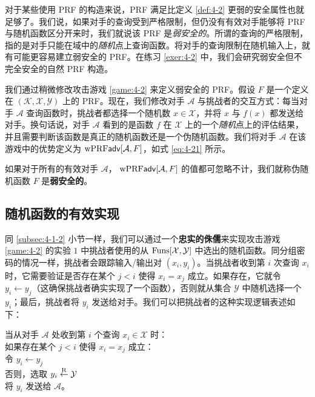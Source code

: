\begin{snote}[弱安全的伪随机函数。]
对于某些使用 PRF 的构造来说，PRF 满足比定义 \ref{def:4-2} 更弱的安全属性也就足够了。我们说，如果对手的查询受到严格限制，但仍没有有效对手能够将 PRF 与随机函数区分开来时，我们就说该 PRF 是\emph{弱安全的}。所谓的查询的严格限制，指的是对手只能在域中的\emph{随机}点上查询函数。将对手的查询限制在随机输入上，就有可能更容易建立弱安全的 PRF。在练习 \ref{exer:4-2} 中，我们会研究弱安全但不完全安全的自然 PRF 构造。

我们通过稍微修改攻击游戏 \ref{game:4-2} 来定义弱安全的 PRF。假设 $F$ 是一个定义在 $(\mathcal{K},\mathcal{X},\mathcal{Y})$ 上的 PRF。现在，我们修改对手 $\mathcal{A}$ 与挑战者的交互方式：每当对手 $\mathcal{A}$ 查询函数时，挑战者都选择一个随机数 $x\in\mathcal{X}$，并将 $x$ 与 $f(x)$ 都发送给对手。换句话说，对手 $\mathcal{A}$ 看到的是函数 $f$ 在 $\mathcal{X}$ 上的一个\emph{随机}点上的评估结果，并且需要判断该函数是真正的随机函数还是一个伪随机函数。我们将对手 $\mathcal{A}$ 在该游戏中的优势定义为 ${\rm wPRF\mathsf{adv}}[\mathcal{A}, F]$，如式 \ref{eq:4-21} 所示。
\end{snote}

\begin{definition}\label{def:4-3}
如果对于所有的有效对手 $\mathcal{A}$， ${\rm wPRF\mathsf{adv}}[\mathcal{A}, F]$ 的值都可忽略不计，我们就称伪随机函数 $F$ 是\textbf{弱安全的}。
\end{definition}

\subsection{随机函数的有效实现}\label{subsec:4-4-2}

同 \ref{subsec:4-1-2} 小节一样，我们可以通过一个\textbf{忠实的侏儒}来实现攻击游戏 \ref{game:4-2} 的实验 $1$ 中挑战者使用的从 ${\rm Funs}[\mathcal{X},\mathcal{Y}]$ 中选出的随机函数。同分组密码的情况一样，挑战者会跟踪输入/输出对 $(x_i,y_i)$。当挑战者收到第 $i$ 次查询 $x_i$ 时，它需要验证是否存在某个 $j < i$ 使得 $x_i=x_j$ 成立。如果存在，它就令 $y_i\leftarrow y_j$（这确保挑战者确实实现了一个函数），否则就从集合 $\mathcal{Y}$ 中随机选择一个 $y_i$；最后，挑战者将 $y_i$ 发送给对手。我们可以把挑战者的这种实现逻辑表述如下：

\vspace{5pt}

\hspace*{5pt} 当从对手 $\mathcal{A}$ 处收到第 $i$ 个查询 $x_i\in\mathcal{X}$ 时：\\
\hspace*{50pt} 如果存在某个 $j<i$ 使得 $x_i=x_j$ 成立：\\
\hspace*{75pt} 令 $y_i\leftarrow y_j$\\
\hspace*{75pt} 否则，选取 $y_i\overset{\rm R}\leftarrow\mathcal{Y}$\\
\hspace*{50pt} 将 $y_i$ 发送给 $\mathcal{A}$。\\

